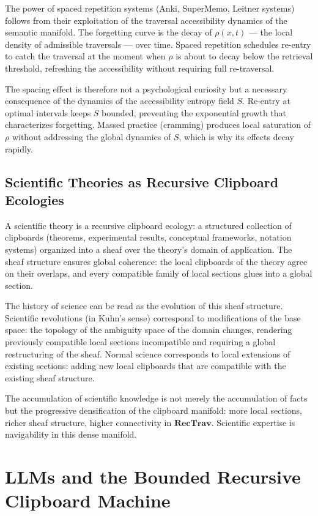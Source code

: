 \documentclass[12pt,oneside]{book}
\theoremstyle{plain}
\theoremstyle{definition}
\theoremstyle{plain}
\newcommand{\RecTrav}{\mathbf{RecTrav}}
\begin{document}
The power of spaced repetition systems (Anki, SuperMemo, Leitner systems) follows from their exploitation of the traversal accessibility dynamics of the semantic manifold. The forgetting curve is the decay of $\rho(x,t)$ — the local density of admissible traversals — over time. Spaced repetition schedules re-entry to catch the traversal at the moment when $\rho$ is about to decay below the retrieval threshold, refreshing the accessibility without requiring full re-traversal.

The spacing effect is therefore not a psychological curiosity but a necessary consequence of the dynamics of the accessibility entropy field $S$. Re-entry at optimal intervals keeps $S$ bounded, preventing the exponential growth that characterizes forgetting. Massed practice (cramming) produces local saturation of $\rho$ without addressing the global dynamics of $S$, which is why its effects decay rapidly.

\section{Scientific Theories as Recursive Clipboard Ecologies}

A scientific theory is a recursive clipboard ecology: a structured collection of clipboards (theorems, experimental results, conceptual frameworks, notation systems) organized into a sheaf over the theory's domain of application. The sheaf structure ensures global coherence: the local clipboards of the theory agree on their overlaps, and every compatible family of local sections glues into a global section.

The history of science can be read as the evolution of this sheaf structure. Scientific revolutions (in Kuhn's sense) correspond to modifications of the base space: the topology of the ambiguity space of the domain changes, rendering previously compatible local sections incompatible and requiring a global restructuring of the sheaf. Normal science corresponds to local extensions of existing sections: adding new local clipboards that are compatible with the existing sheaf structure.

The accumulation of scientific knowledge is not merely the accumulation of facts but the progressive densification of the clipboard manifold: more local sections, richer sheaf structure, higher connectivity in $\RecTrav$. Scientific expertise is navigability in this dense manifold.

\chapter{LLMs and the Bounded Recursive Clipboard Machine}
\label{ch:llms}
\end{document}
